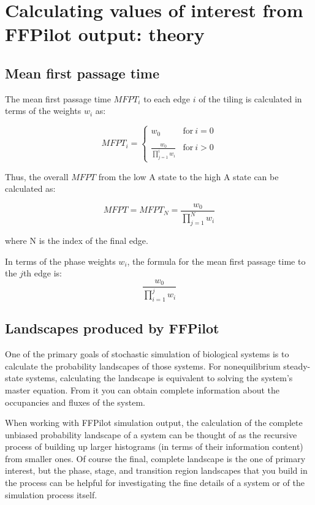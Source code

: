 \chapter{Calculating values of interest from FFPilot output: theory}
\section{Mean first passage time}
The mean first passage time $MFPT_i$ to each edge $i$ of the tiling is calculated in terms of the weights $w_i$ as:

\begin{equation}
    MFPT_i = 
        \begin{cases}
            w_0 & \text{for}\ i=0 \\
            \\
            \frac{w_0}{\prod_{j=1}^{i} w_i} & \text{for}\ i>0
        \end{cases}
\end{equation}

Thus, the overall $MFPT$ from the low A state to the high A state can be calculated as:

\begin{equation}\label{eq:mfpt_from_weights}
    MFPT = MFPT_N = \frac{w_0}{\prod_{j=1}^{N} w_i}
\end{equation}

where N is the index of the final edge.

In terms of the phase weights $w_i$, the formula for the mean first passage time to the $j$th edge is:
\begin{equation*}
    \frac{w_0}{\prod_{i=1}^{j} w_i}
\end{equation*}

\section{Landscapes produced by FFPilot}\label{sec:landscape_theory}

One of the primary goals of stochastic simulation of biological systems is to calculate the probability landscapes of those systems. For nonequilibrium steady-state systems, calculating the landscape is equivalent to solving the system's master equation. From it you can obtain complete information about the occupancies and fluxes of the system.

When working with FFPilot simulation output, the calculation of the complete unbiased probability landscape of a system can be thought of as the recursive process of building up larger histograms (in terms of their information content) from smaller ones. Of course the final, complete landscape is the one of primary interest, but the phase, stage, and transition region landscapes that you build in the process can be helpful for investigating the fine details of a system or of the simulation process itself.

